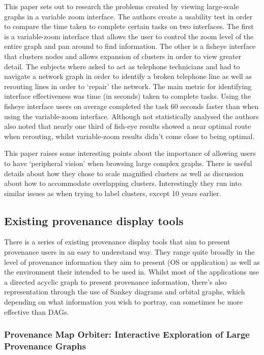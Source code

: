 This paper sets out to research the problems created by viewing large-scale graphs in a variable zoom interface. The authors create a usability test in order to compare the time taken to complete certain tasks on two interfaces. The first is a variable-zoom interface that allows the user to control the zoom level of the entire graph and pan around to find information. The other is a fisheye interface that clusters nodes and allows expansion of clusters in order to view greater detail. The subjects where asked to act as telephone technicians and had to navigate a network graph in order to identify a broken telephone line as well as rerouting lines in order to `repair' the network. The main metric for identifying interface effectiveness was time (in seconds) taken to complete tasks. Using the fisheye interface users on average completed the task 60 seconds faster than when using the variable-zoom interface. Although not statistically analysed the authors also noted that nearly one third of fish-eye results showed a near optimal route when rerouting, whilst variable-zoom results didn't come close to being optimal.

This paper raises some interesting points about the importance of allowing users to have `peripheral vision' when browsing large complex graphs. There is useful details about how they chose to scale magnified clusters as well as discussion about how to accommodate overlapping clusters. Interestingly they run into similar issues as \cite{Abello2006} when trying to label clusters, except 10 years earlier.  

\subsection{Existing provenance display tools}
\label{sub:existing_provenance_display_tools}

There is a series of existing provenance display tools that aim to present provenance users in an easy to understand way. They range quite broadly in the level of provenance information they aim to present (OS or application) as well as the environment their intended to be used in. Whilst most of the applications use a directed acyclic graph to present provenance information, there's also representation through the use of Sankey diagrams and orbital graphs, which depending on what information you wish to portray, can sometimes be more effective than DAGs.

\subsubsection{Provenance Map Orbiter: Interactive Exploration of Large Provenance Graphs \cite{Seltzer2011}}
\label{sub:provenance_map_orbiter_interactive_exploration_of_large_provenance_graphs}

